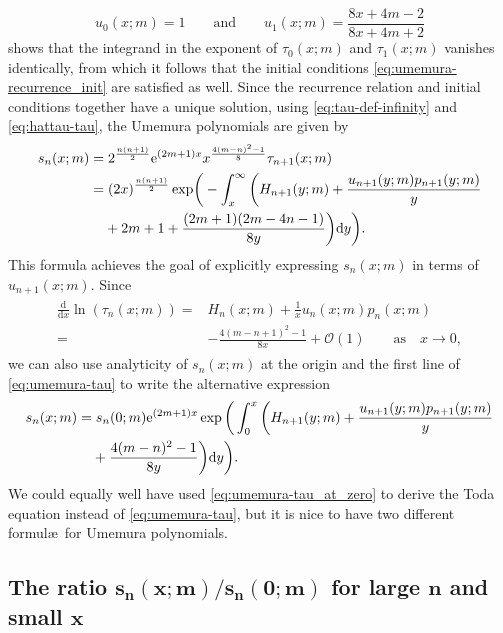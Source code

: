 \documentclass[pdftex]{sigma}
\numberwithin{equation}{section}
\newcommand{\ee}{\mathrm{e}}
\newcommand{\dd}{\mathrm{d}}
\begin{document}
\[
u_0(x;m)=1 \qquad\text{and}\qquad u_1(x;m)=\frac{8x+4m-2}{8x+4m+2}
\]
shows that the integrand in the exponent of $\tau_0(x;m)$ and $\tau_1(x;m)$ vanishes identically, from which it follows that the initial conditions \eqref{eq:umemura-recurrence_init} are satisfied as well. Since the recurrence relation and initial conditions together have a unique solution,
using \eqref{eq:tau-def-infinity} and \eqref{eq:hattau-tau}, the Umemura polynomials are given by
\begin{align}
&s_n(x;m)= 2^{\frac{n(n+1)}{2}} \ee^{ (2 m+1)x} x^{\frac{4(m-n)^2-1}{8}}{\tau}_{n+1}(x;m)\nonumber\\
 &\hphantom{s_n(x;m)}{}=(2x)^{\frac{n(n+1)}{2}} \exp\biggr(-\int_x^\infty\bigg(H_{n+1}(y;m)+\frac{u_{n+1}(y;m)p_{n+1}(y;m)}{y}\nonumber\\
&\hphantom{s_n(x;m)=}{}+2m+1+\frac{(2m+1)(2m-4n-1)}{8y}\bigg) \dd y\biggl).
 \label{eq:umemura-tau}
\end{align}
This formula achieves the goal of explicitly expressing $s_n(x;m)$ in terms of $u_{n+1}(x;m)$.
Since
\begin{align*}
\begin{split}
\frac{\dd}{\dd x}\ln(\tau_n(x;m))={}&H_n(x;m)+\frac{1}{x}u_n(x;m)p_n(x;m) \\
={}&-\frac{4(m-n+1)^2-1}{8 x}+\mathcal{O}(1) \qquad \text{as} \quad x\to 0,
\end{split}
\end{align*}
we can also use analyticity of $s_n(x;m)$ at the origin and the first line of \eqref{eq:umemura-tau} to write the alternative expression
\begin{align}
 &s_n(x;m)=s_n(0;m) \ee^{ (2 m+1)x}\exp\bigg(\int_0^x\bigg( H_{n+1}(y;m)+\frac{u_{n+1}(y;m)p_{n+1}(y;m)}{y}\nonumber\\
&\hphantom{s_n(x;m)=}{} +\frac{4(m-n)^2-1}{8 y}\bigg) \dd y\bigg).
\label{eq:umemura-tau_at_zero}
\end{align}
We could equally well have used \eqref{eq:umemura-tau_at_zero} to derive the Toda equation instead of \eqref{eq:umemura-tau}, but it is nice to have two different formul\ae\ for Umemura polynomials.

\subsection[The ratio s\_n(x;m)/s\_n(0;m) for large n and small x]{The ratio $\boldsymbol{s_n(x;m)/s_n(0;m)}$ for large $\boldsymbol{n}$ and small $\boldsymbol{x}$}
\end{document}

